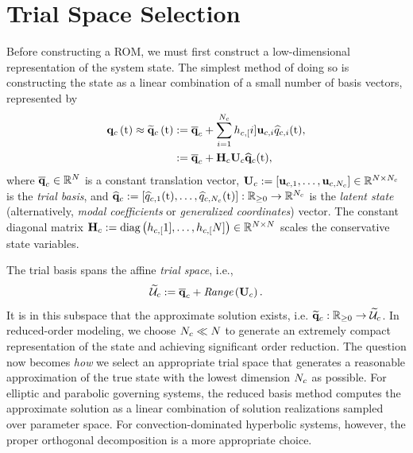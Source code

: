 \section{Trial Space Selection}
%
Before constructing a ROM, we must first construct a low-dimensional representation of the system state. The simplest method of doing so is constructing the state as a linear combination of a small number of basis vectors, represented by
%
\begin{equation}\label{eq:consSolApprox}
    \begin{aligned}
        \consFunc{\timeVar} \approx \consFuncRom{\timeVar} &\defEq \consVecCent + \sum_{\dummyIdx=1}^{\numConsModes} \consScaleVar[\dummyIdx] \consTrialVecIdx \consVarCoefIdx (\timeVar), \\
        &\defEq \consAffineMap(\timeVar),
    \end{aligned}
\end{equation}
%
where $\mathbf{\overline{q}}_{c} \in \mathbb{R}^{N}$ is a constant translation vector, $\consTrial \defEq \left[\consTrialVec{1},\hdots,\consTrialVec{\numConsModes}\right] \inRTwo{\numDOF}{\numConsModes}$ is the \textit{trial basis}, and $\mathbf{\widehat{q}}_{c} := \left[\widehat{q}_{c,1}(\text{t}),\hdots,\widehat{q}_{c,N_c}(\text{t})\right]: \mathbb{R}_{\ge 0} \rightarrow \mathbb{R}^{N_c}$ is the \textit{latent state} (alternatively, \textit{modal coefficients} or \textit{generalized coordinates}) vector. The constant diagonal matrix $\consScale \defEq \text{diag}\left(\consScaleVar[1], \hdots , \consScaleVar[\numDOF]\right) \inRTwo{\numDOF}{\numDOF}$ scales the conservative state variables.

The trial basis spans the affine \textit{trial space}, i.e.,
%
\begin{equation}
    \consTrialSpace \defEq \consVecCent + \textit{Range}\left(\consTrial\right).
\end{equation}
%
It is in this subspace that the approximate solution exists, i.e. $\funcMap{\consVecRom}{\nonnegReals}{\consTrialSpace}$. In reduced-order modeling, we choose $N_c \ll N$ to generate an extremely compact representation of the state and achieving significant order reduction. The question now becomes \textit{how} we select an appropriate trial space that generates a reasonable approximation of the true state with the lowest dimension $N_c$ as possible. For elliptic and parabolic governing systems, the reduced basis method computes the approximate solution as a linear combination of solution realizations sampled over parameter space. For convection-dominated hyperbolic systems, however, the proper orthogonal decomposition is a more appropriate choice.

